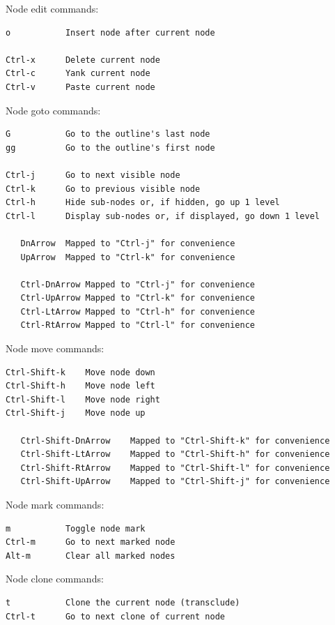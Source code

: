 \documentclass[a4paper,10pt,english]{sphinxmanual}
\begin{document}
Node edit commands:

\begin{Verbatim}[commandchars=\\\{\}]
o           Insert node after current node

Ctrl-x      Delete current node
Ctrl-c      Yank current node
Ctrl-v      Paste current node
\end{Verbatim}

Node goto commands:

\begin{Verbatim}[commandchars=\\\{\}]
G           Go to the outline's last node
gg          Go to the outline's first node

Ctrl-j      Go to next visible node
Ctrl-k      Go to previous visible node
Ctrl-h      Hide sub-nodes or, if hidden, go up 1 level
Ctrl-l      Display sub-nodes or, if displayed, go down 1 level

   DnArrow  Mapped to "Ctrl-j" for convenience
   UpArrow  Mapped to "Ctrl-k" for convenience

   Ctrl-DnArrow Mapped to "Ctrl-j" for convenience
   Ctrl-UpArrow Mapped to "Ctrl-k" for convenience
   Ctrl-LtArrow Mapped to "Ctrl-h" for convenience
   Ctrl-RtArrow Mapped to "Ctrl-l" for convenience
\end{Verbatim}

Node move commands:

\begin{Verbatim}[commandchars=\\\{\}]
Ctrl-Shift-k    Move node down
Ctrl-Shift-h    Move node left
Ctrl-Shift-l    Move node right
Ctrl-Shift-j    Move node up

   Ctrl-Shift-DnArrow    Mapped to "Ctrl-Shift-k" for convenience
   Ctrl-Shift-LtArrow    Mapped to "Ctrl-Shift-h" for convenience
   Ctrl-Shift-RtArrow    Mapped to "Ctrl-Shift-l" for convenience
   Ctrl-Shift-UpArrow    Mapped to "Ctrl-Shift-j" for convenience
\end{Verbatim}

Node mark commands:

\begin{Verbatim}[commandchars=\\\{\}]
m           Toggle node mark
Ctrl-m      Go to next marked node
Alt-m       Clear all marked nodes
\end{Verbatim}

Node clone commands:

\begin{Verbatim}[commandchars=\\\{\}]
t           Clone the current node (transclude)
Ctrl-t      Go to next clone of current node
\end{Verbatim}
\end{document}
